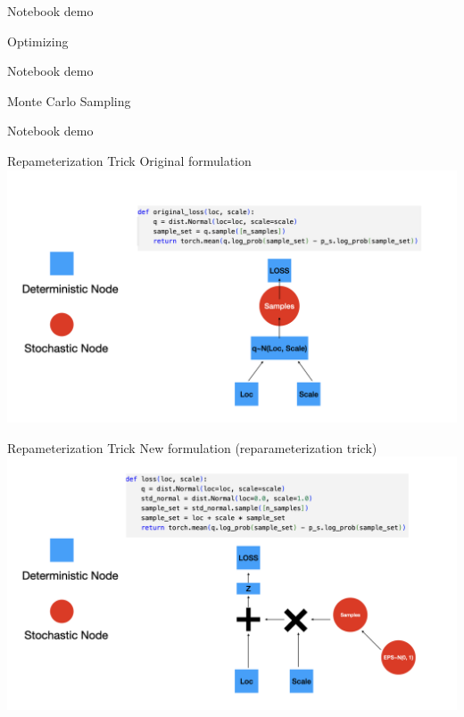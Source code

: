 \documentclass{beamer}
\begin{document}
\begin{frame}
    Notebook demo
\end{frame}

\begin{frame}{Optimizing}
    
\end{frame}

\begin{frame}
    Notebook demo
\end{frame}

\begin{frame}{Monte Carlo Sampling}
    
\end{frame}

\begin{frame}
    Notebook demo
\end{frame}

\begin{frame}{Repameterization Trick}
    Original formulation
    \includegraphics[width=\textwidth]{../diagrams/reparam.001.png}
    
\end{frame}

\begin{frame}{Repameterization Trick}
    New formulation (reparameterization trick)
    \includegraphics[width=\textwidth]{../diagrams/reparam.002.png}
    
\end{frame}
\end{document}
